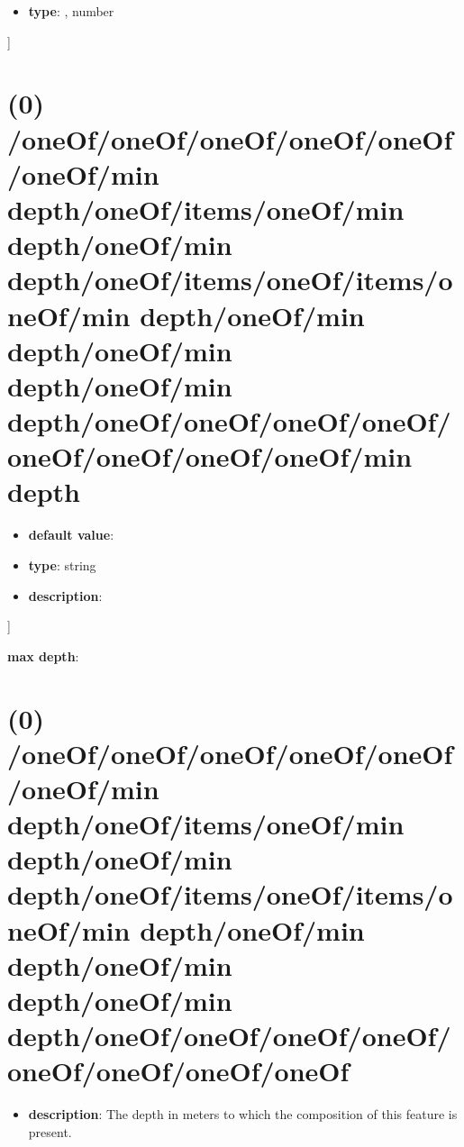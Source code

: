 \begin{itemize}[leftmargin=5em]\item {\bf type}: , number\end{itemize}]\section{(0) /oneOf/oneOf/oneOf/oneOf/oneOf/oneOf/min depth/oneOf/items/oneOf/min depth/oneOf/min depth/oneOf/items/oneOf/items/oneOf/min depth/oneOf/min depth/oneOf/min depth/oneOf/min depth/oneOf/oneOf/oneOf/oneOf/oneOf/oneOf/oneOf/oneOf/min depth}
\begin{itemize}[leftmargin=0em]\item {\bf default value}: 
\item {\bf type}: string
\item {\bf description}: 
\end{itemize}]\item {\bf max depth}: \section{(0) /oneOf/oneOf/oneOf/oneOf/oneOf/oneOf/min depth/oneOf/items/oneOf/min depth/oneOf/min depth/oneOf/items/oneOf/items/oneOf/min depth/oneOf/min depth/oneOf/min depth/oneOf/min depth/oneOf/oneOf/oneOf/oneOf/oneOf/oneOf/oneOf/oneOf}
\begin{itemize}[leftmargin=0em]\item {\bf description}: The depth in meters to which the composition of this feature is present.
\end{itemize}
